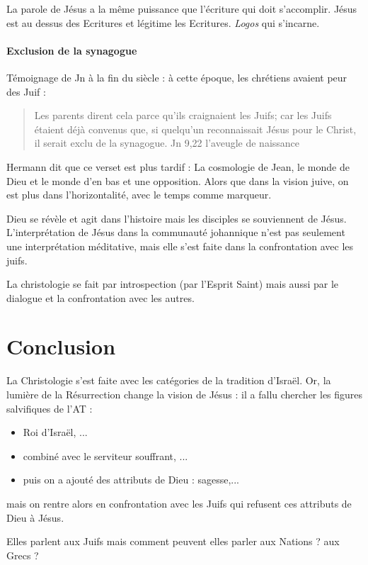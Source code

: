 La parole de Jésus a la même puissance que l'écriture qui doit s'accomplir. Jésus est au dessus des Ecritures et légitime les Ecritures. \textit{Logos} qui s'incarne.  

\paragraph{Exclusion de la synagogue} Témoignage de Jn à la fin du siècle : à cette époque, les chrétiens avaient peur des Juif : 
\begin{quote}
Les parents dirent cela parce qu'ils craignaient les Juifs; car les Juifs étaient déjà convenus que, si quelqu'un reconnaissait Jésus pour le Christ, il serait exclu de la synagogue.
    Jn 9,22 l'aveugle de naissance
\end{quote}

Hermann dit que ce verset est plus tardif : La cosmologie de Jean, le monde de Dieu et le monde d'en bas et une opposition. Alors que dans la vision juive, on est plus dans l'horizontalité, avec le temps comme marqueur.
 
Dieu se révèle et agit dans l'histoire mais les disciples se souviennent de Jésus. L'interprétation de Jésus dans la communauté johannique n'est pas seulement une interprétation méditative, mais elle s'est faite dans la confrontation avec les juifs.

La christologie se fait par introspection (par l'Esprit Saint) mais aussi par le dialogue et la confrontation avec les autres. 

\hypertarget{conclusion}{%
\section{Conclusion}\label{conclusion}}


\begin{Synthesis}
    La Christologie s'est faite avec les catégories de la tradition d'Israël. Or, la lumière de la Résurrection change la vision de Jésus : il a fallu chercher les figures salvifiques de l'AT :
    \begin{itemize}
        \item Roi d'Israël, ...
        \item combiné avec le serviteur souffrant, ... 
        \item puis on a ajouté des attributs de Dieu : sagesse,...
    \end{itemize}
     mais on rentre alors en confrontation avec les Juifs qui refusent ces attributs de Dieu à Jésus.
   
\end{Synthesis}

 Elles parlent aux Juifs mais comment peuvent elles parler aux Nations ? aux Grecs ? 